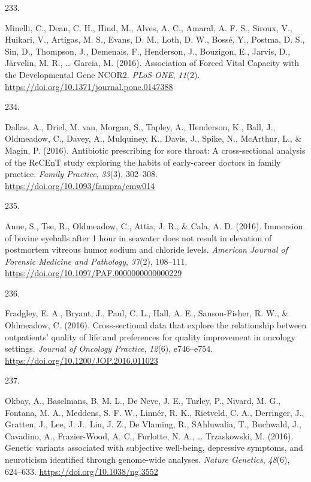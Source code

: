 \documentclass[11pt, a4paper]{awesome-cv}
\newlength{\csllabelwidth}
\newcommand{\CSLLeftMargin}[1]{\parbox[t]{\csllabelwidth}{#1}}
\newcommand{\CSLRightInline}[1]{\parbox[t]{\linewidth - \csllabelwidth}{#1}}
\begin{document}
\leavevmode\hypertarget{ref-minelli_association_2016}{}%
\CSLLeftMargin{233. }
\CSLRightInline{Minelli, C., Dean, C. H., Hind, M., Alves, A. C.,
Amaral, A. F. S., Siroux, V., Huikari, V., Artigas, M. S., Evans, D. M.,
Loth, D. W., Bossé, Y., Postma, D. S., Sin, D., Thompson, J., Demenais,
F., Henderson, J., Bouzigon, E., Jarvis, D., Järvelin, M. R., \ldots{}
Garcia, M. (2016). Association of Forced Vital Capacity with the
Developmental Gene NCOR2. \emph{PLoS ONE}, \emph{11}(2).
\url{https://doi.org/10.1371/journal.pone.0147388}}

\leavevmode\hypertarget{ref-dallas_antibiotic_2016}{}%
\CSLLeftMargin{234. }
\CSLRightInline{Dallas, A., Driel, M. van, Morgan, S., Tapley, A.,
Henderson, K., Ball, J., Oldmeadow, C., Davey, A., Mulquiney, K., Davis,
J., Spike, N., McArthur, L., \& Magin, P. (2016). Antibiotic prescribing
for sore throat: A cross-sectional analysis of the ReCEnT study
exploring the habits of early-career doctors in family practice.
\emph{Family Practice}, \emph{33}(3), 302--308.
\url{https://doi.org/10.1093/fampra/cmw014}}

\leavevmode\hypertarget{ref-anne_immersion_2016}{}%
\CSLLeftMargin{235. }
\CSLRightInline{Anne, S., Tse, R., Oldmeadow, C., Attia, J. R., \& Cala,
A. D. (2016). Immersion of bovine eyeballs after 1 hour in seawater does
not result in elevation of postmortem vitreous humor sodium and chloride
levels. \emph{American Journal of Forensic Medicine and Pathology},
\emph{37}(2), 108--111.
\url{https://doi.org/10.1097/PAF.0000000000000229}}

\leavevmode\hypertarget{ref-fradgley_cross-sectional_2016}{}%
\CSLLeftMargin{236. }
\CSLRightInline{Fradgley, E. A., Bryant, J., Paul, C. L., Hall, A. E.,
Sanson-Fisher, R. W., \& Oldmeadow, C. (2016). Cross-sectional data that
explore the relationship between outpatients' quality of life and
preferences for quality improvement in oncology settings. \emph{Journal
of Oncology Practice}, \emph{12}(6), e746--e754.
\url{https://doi.org/10.1200/JOP.2016.011023}}

\leavevmode\hypertarget{ref-okbay_genetic_2016}{}%
\CSLLeftMargin{237. }
\CSLRightInline{Okbay, A., Baselmans, B. M. L., De Neve, J. E., Turley,
P., Nivard, M. G., Fontana, M. A., Meddens, S. F. W., Linnér, R. K.,
Rietveld, C. A., Derringer, J., Gratten, J., Lee, J. J., Liu, J. Z., De
Vlaming, R., SAhluwalia, T., Buchwald, J., Cavadino, A., Frazier-Wood,
A. C., Furlotte, N. A., \ldots{} Trzaskowski, M. (2016). Genetic
variants associated with subjective well-being, depressive symptoms, and
neuroticism identified through genome-wide analyses. \emph{Nature
Genetics}, \emph{48}(6), 624--633.
\url{https://doi.org/10.1038/ng.3552}}
\end{document}
